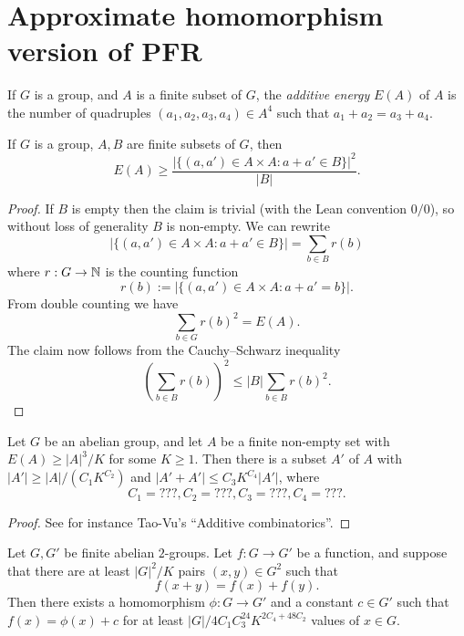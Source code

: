 \chapter{Approximate homomorphism version of PFR}

\begin{definition}\label{energy-def}  If $G$ is a group, and $A$ is a finite subset of $G$, the \emph{additive energy} $E(A)$ of $A$ is the number of quadruples $(a_1,a_2,a_3,a_4) \in A^4$ such that $a_1+a_2 = a_3+a_4$.
\end{definition}

\begin{lemma}\label{cs-bound}  If $G$ is a group, $A,B$ are finite subsets of $G$, then
$$ E(A) \geq \frac{|\{ (a,a') \in A \times A: a+a' \in B \}|^2}{|B|}.$$
\end{lemma}

\begin{proof}  If $B$ is empty then the claim is trivial (with the Lean convention $0/0$), so without loss of generality $B$ is non-empty.  We can rewrite
$$ |\{ (a,a') \in A \times A: a+a' \in B \}| = \sum_{b \in B} r(b)$$
where $r: G \to \mathbb{N}$ is the counting function
$$ r(b) := |\{ (a,a') \in A \times A: a+a' = b \}|.$$
From double counting we have
$$ \sum_{b \in G} r(b)^2 = E(A).$$
The claim now follows from the Cauchy--Schwarz inequality
$$ (\sum_{b \in B} r(b))^2 \leq |B| \sum_{b \in B} r(b)^2.$$
\end{proof}

\begin{lemma}\label{bsg} Let $G$ be an abelian group, and let $A$ be a finite non-empty set with $E(A) \geq |A|^3 / K$ for some $K \geq 1$.  Then there is a subset $A'$ of $A$ with $|A'| \geq |A| / (C_1 K^{C_2})$ and $|A'+A'| \leq C_3 K^{C_4} |A'|$, where
$$ C_1 = ???, C_2 = ???, C_3 = ???, C_4 = ???.$$
\end{lemma}

\begin{proof} See for instance Tao-Vu's ``Additive combinatorics''.
\end{proof}

\begin{theorem}\label{approx-hom-pfr} Let $G,G'$ be finite abelian $2$-groups.
  Let $f: G \to G'$ be a function, and suppose that there are at least $|G|^2 / K$ pairs $(x,y) \in G^2$ such that
$$ f(x+y) = f(x) + f(y).$$
Then there exists a homomorphism $\phi: G \to G'$ and a constant $c \in G'$ such that $f(x) = \phi(x)+c$ for at least $|G| / 4C_1 C_3^{24} K^{2C_4+48 C_2}$ values of $x \in G$.
\end{theorem}

